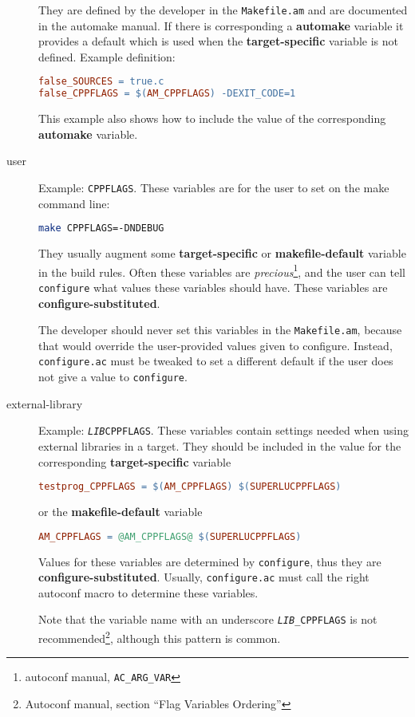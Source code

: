 \documentclass[11pt,a4paper,headinclude,footinclude,DIV16,normalheadings]{scrartcl}
\begin{document}
\begin{description}
  They are defined by the developer in the \texttt{Makefile.am} and are
  documented in the automake manual.  If there is corresponding a {\bf
    automake} variable it provides a default which is used when the {\bf
    target-specific} variable is not defined.  Example definition:
  \begin{lstlisting}[language=make]
false_SOURCES = true.c
false_CPPFLAGS = $(AM_CPPFLAGS) -DEXIT_CODE=1
  \end{lstlisting}
  This example also shows how to include the value of the corresponding {\bf
    automake} variable.
\item[user] Example: \texttt{CPPFLAGS}.  These variables are for the user to
  set on the make command line:
  \begin{lstlisting}[language=sh]
make CPPFLAGS=-DNDEBUG
  \end{lstlisting}
  They usually augment some {\bf target-specific} or {\bf makefile-default}
  variable in the build rules.  Often these variables are {\em
    precious}\footnote{autoconf manual,
    \lstinline[language=sh]{AC_ARG_VAR}}, and the user can tell
  \texttt{configure} what values these variables should have.  These variables
  are {\bf configure-substituted}.

  The developer should never set this
  variables in the \texttt{Makefile.am}, because that would override the
  user-provided values given to configure.  Instead, \texttt{configure.ac}
  must be tweaked to set a different default if the user does not give a value
  to \texttt{configure}.
\item[external-library] Example: \texttt{\textit{LIB}CPPFLAGS}.  These
  variables contain settings needed when using external libraries in a
  target.  They should be included in the value for the corresponding {\bf
    target-specific} variable
  \begin{lstlisting}[language=make]
testprog_CPPFLAGS = $(AM_CPPFLAGS) $(SUPERLUCPPFLAGS)
  \end{lstlisting}
  or the {\bf makefile-default} variable
  \begin{lstlisting}[language=make]
AM_CPPFLAGS = @AM_CPPFLAGS@ $(SUPERLUCPPFLAGS)
  \end{lstlisting}
  Values for these variables are determined by \texttt{configure}, thus they
  are {\bf configure-substituted}.  Usually,
  \texttt{configure.ac} must call the right autoconf macro to determine these
  variables.

  Note that the variable name with an underscore
  \texttt{\textit{LIB}\_CPPFLAGS} is not recommended\footnote{Autoconf
    manual, section ``Flag Variables Ordering''}, although this pattern is
  common.
\end{description}
\end{document}
